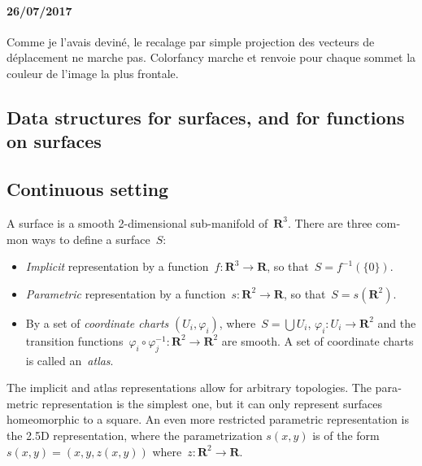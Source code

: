 \documentclass{article}
\def\R{\mathbf{R}} %
\begin{document}
\paragraph{26/07/2017} Comme je l'avais deviné, le recalage par simple projection des vecteurs de déplacement ne marche pas. Colorfancy marche et renvoie pour chaque sommet la couleur de l'image la plus frontale.
\clearpage
\begin{otherlanguage}{british}
\section{Data structures for surfaces, and for functions on surfaces}

\subsection{Continuous setting}

A surface is a smooth 2-dimensional sub-manifold of~$\R^3$.
There are three common ways to define a surface~$S$:
\begin{itemize}
	\item \emph{Implicit} representation by a function~$f:\R^3\to\R$,
		so that~$S=f^{-1}(\{0\})$.
	\item \emph{Parametric} representation by a function~$s:\R^2\to\R$,
		so that~$S=s(\R^2)$.

	\item By a set of \emph{coordinate charts} $(U_i,\varphi_i)$,
		where~$S=\bigcup U_i$, $\varphi_i:U_i\to\R^2$ and the transition
		functions~$\varphi_i\circ\varphi_j^{-1}:\R^2\to\R^2$ are
		smooth.  A set of coordinate charts is called
		an~\emph{atlas}.
\end{itemize}
The implicit and atlas representations allow for arbitrary topologies.  The
parametric representation is the simplest one, but it can only represent
surfaces homeomorphic to a square.  An even more restricted parametric
representation is the 2.5D representation, where the parametrization $s(x,y)$
is of the form~$s(x,y)=(x,y,z(x,y))$ where~$z:\R^2\to\R$.


\end{otherlanguage}
\end{document}
